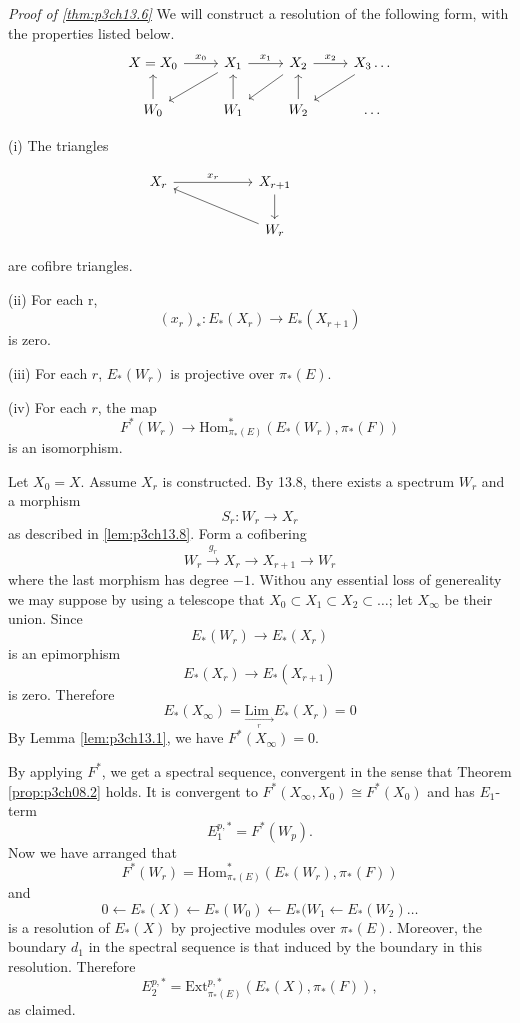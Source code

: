\documentclass[../main]{subfiles}
\begin{document}
\emph{Proof of \ref{thm:p3ch13.6}} We will construct a resolution of the following form, with the properties listed below.
\[\begin{tikzcd}
	{X=X_0} & {X_1} & {X_2} & {X_3 \dots} \\
	{W_0} & {W_1} & {W_2} & \dots
	\arrow["{x_1}", from=1-2, to=1-3]
	\arrow["{x_2}", from=1-3, to=1-4]
	\arrow[from=1-4, to=2-3]
	\arrow[from=2-3, to=1-3]
	\arrow[from=1-3, to=2-2]
	\arrow[from=2-2, to=1-2]
	\arrow["{x_0}", from=1-1, to=1-2]
	\arrow[from=1-2, to=2-1]
	\arrow[from=2-1, to=1-1]
\end{tikzcd}\]

(i) The triangles

\[\begin{tikzcd}
	{X_r} & {} & {X_{r+1}} \\
	&& {W_r} && {}
	\arrow["{x_r}", from=1-1, to=1-3]
	\arrow[from=1-3, to=2-3]
	\arrow[from=2-3, to=1-1]
\end{tikzcd}\]

are cofibre triangles.

(ii) For each r,
\[(x_r)_\ast \colon E_\ast(X_r) \longrightarrow E_\ast(X_{r+1})\]
is zero.

(iii) For each $r$, $E_\ast(W_r)$ is projective over $\pi_\ast(E)$.

(iv) For each $r$, the map
\[F^\ast(W_r) \longrightarrow \text{Hom}^\ast_{\pi_\ast(E)}(E_\ast(W_r), \pi_\ast(F))\]
is an isomorphism.

Let $X_0 = X$. Assume $X_r$ is constructed. By 13.8, there exists a spectrum $W_r$ and a morphism
\[S_r \colon W_r \longrightarrow X_r\]
as described in \ref{lem:p3ch13.8}. Form a cofibering
\[W_r\overset{g_r}{\longrightarrow} X_r \longrightarrow X_{r+1} \longrightarrow W_r\]
where the last morphism has degree $-1$. Withou any essential loss of genereality we may suppose by using a telescope that $X_0 \subset X_1 \subset X_2 \subset \dots$; let $X_\infty$ be their union. Since
\[E_\ast(W_r) \longrightarrow E_\ast(X_r)\]
is an epimorphism
\[E_\ast(X_r) \longrightarrow E_\ast(X_{r+1})\]
is zero. Therefore
\[E_\ast(X_\infty) = \underset{\underset{r}{\longrightarrow}}{\text{Lim }} E_\ast(X_r) = 0\]
By Lemma \ref{lem:p3ch13.1}, we have $F^\ast(X_\infty) = 0$.

By applying $F^\ast$, we get a spectral sequence, convergent in the sense that Theorem \ref{prop:p3ch08.2} holds. It is convergent to $F^\ast(X_\infty, X_0) \cong F^\ast(X_0)$ and has $E_1$-term
\[E^{p, \ast}_1 = F^\ast(W_p).\]
Now we have arranged that
\[F^\ast(W_r) = \text{Hom}^\ast_{\pi_\ast(E)}(E_\ast(W_r), \pi_\ast(F))\]
and
\[0 \longleftarrow E_\ast(X) \longleftarrow E_\ast(W_0) \longleftarrow E_\ast(W_1 \longleftarrow E_\ast(W_2) \dots\]
is a resolution of $E_\ast(X)$ by projective modules over $\pi_\ast(E)$. Moreover, the boundary $d_1$ in the spectral sequence is that induced by the boundary in this resolution. Therefore
\[E_2^{p, \ast} = \text{Ext}^{p, \ast}_{\pi_\ast(E)}(E_\ast(X), \pi_\ast(F)),\]
as claimed.
\end{document}
